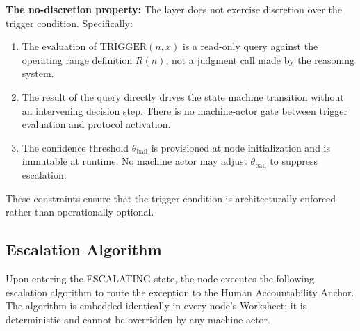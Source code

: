 \bigskip
\noindent\textbf{The no-discretion property:} The \bounds{} layer does not
exercise discretion over the trigger condition. Specifically:

\begin{enumerate}
\item The evaluation of $\text{TRIGGER}(n, x)$ is a read-only query against
  the operating range definition $R(n)$, not a judgment call made by the
  reasoning system.
\item The result of the query directly drives the state machine transition
  without an intervening decision step. There is no machine-actor gate
  between trigger evaluation and protocol activation.
\item The confidence threshold $\theta_{\text{bail}}$ is provisioned at
  node initialization and is immutable at runtime. No machine actor may
  adjust $\theta_{\text{bail}}$ to suppress escalation.
\end{enumerate}

These constraints ensure that the trigger condition is architecturally
enforced rather than operationally optional.


\subsection{Escalation Algorithm}\label{sec:bailout-escalation}

Upon entering the ESCALATING state, the node executes the following escalation
algorithm to route the exception to the Human Accountability Anchor. The
algorithm is embedded identically in every node's Worksheet; it is
deterministic and cannot be overridden by any machine actor.

